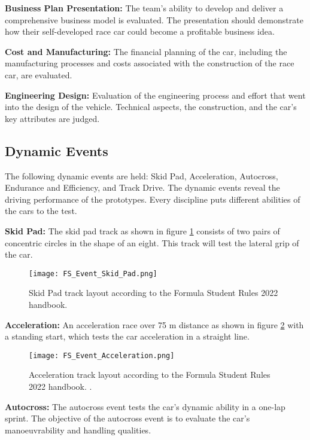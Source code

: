 \textbf{Business Plan Presentation:} The team's ability to develop and deliver a comprehensive business model is evaluated. The presentation should demonstrate how their self-developed race car could become a profitable business idea.

\textbf{Cost and Manufacturing:} The financial planning of the car, including the manufacturing processes and costs associated with the construction of the race car, are evaluated.

\textbf{Engineering Design:} Evaluation of the engineering process and effort that went into the design of the vehicle. Technical aspects, the construction, and the car's key attributes are judged.

\subsection{Dynamic Events} \label{sec:Dynamic Events}
The following dynamic events are held: Skid Pad, Acceleration, Autocross, Endurance and Efficiency, and Track Drive.
The dynamic events reveal the driving performance of the prototypes. Every discipline puts different abilities of the cars to the test. \cite{fs_rules_2022_handbook}

\textbf{Skid Pad:} The skid pad track as shown in figure \ref{fig:FS Skid Pad layout} consists of two pairs of concentric circles in the shape of an eight. This track will test the lateral grip of the car.
\begin{figure}[H]
    \centering
    \texttt{[image: FS\_Event\_Skid\_Pad.png]}
    \caption{Skid Pad track layout according to the Formula Student Rules 2022 handbook. \cite{fs_rules_2022_handbook}}
    \label{fig:FS Skid Pad layout}
\end{figure}

\textbf{Acceleration:} An acceleration race over 75 m distance as shown in figure \ref{fig:FS Acceleration layout} with a standing start, which tests the car acceleration in a straight line.
\begin{figure}[H]
    \centering
    \texttt{[image: FS\_Event\_Acceleration.png]}
    \caption{Acceleration track layout according to the Formula Student Rules 2022 handbook. \cite{fs_rules_2022_handbook}.}
    \label{fig:FS Acceleration layout}
\end{figure}

\textbf{Autocross:} The autocross event tests the car's dynamic ability in a one-lap sprint. The objective of the autocross event is to evaluate the car's manoeuvrability and handling qualities.

